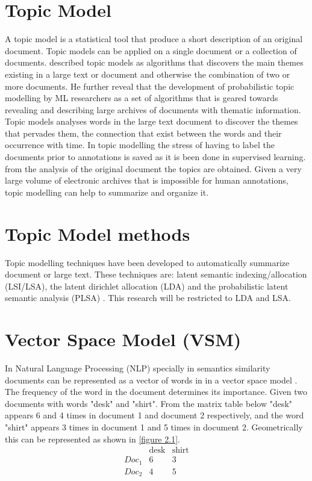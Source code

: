 \section{Topic Model}  
A topic model is a statistical tool that produce a short description of an original document. Topic models can be applied on a single document or a collection of documents. \citep{blei2012surveying} described topic models as algorithms that discovers the main themes existing in a large text or document and otherwise the combination of two or more documents. He further reveal that the development of probabilistic topic modelling by ML  researchers as a set of algorithms that is geared towards revealing and describing large archives of documents with thematic information. Topic models analyses words in the large text document to discover the themes that pervades them, the connection that exist between the words and their occurrence with time. In topic modelling the stress of having to label the documents prior to annotations is saved as it is been done in supervised learning. from the analysis of the original document the topics are obtained. Given a very large volume of electronic archives that is impossible for human annotations, topic modelling can help to summarize and organize it.
\section{Topic Model methods}
Topic modelling techniques have been developed to automatically summarize document or large text. These techniques are: latent semantic indexing/allocation  (LSI/LSA), the latent dirichlet allocation (LDA) and the probabilistic latent semantic analysis (PLSA) . This research will be restricted to LDA and LSA.
\section{Vector Space Model (VSM)}

In Natural Language Processing (NLP) specially in semantics similarity documents can be represented as a vector of words in in a vector space model \cite{salton1975vector}. The frequency of the word in the document determines its importance. Given two documents with words  "desk" and "shirt". From the matrix table below "desk" appears 6 and 4 times in document 1 and document 2 respectively, and the word "shirt" appears 3 times in document 1 and 5 times in document 2. Geometrically this can be represented as shown in \eqref{figure 2.1}.
$$\begin{array}{cccc}
 &\text{desk} & \text{shirt} \\ 
 Doc_1 & 6 & 3\\ 
 Doc_2 & 4 & 5
\end{array} $$


